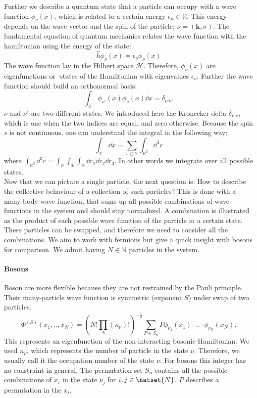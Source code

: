 \documentclass[../main.tex]{subfile}
\begin{document}
Further we describe a quantum state that a particle can occupy with a wave function $\phi_{\nu}(x)$, 
which is related to a certain energy $\epsilon_n \in\mathbb{R}$. This energy depends on 
the wave vector and the spin of the particle: $\nu = (\bm{k}, \sigma)$. The fundamental equation of
quantum mechanics relates the wave function with the hamiltonian using the energy of the state:
\[
    \hat{h} \phi_{\nu}(x) = \epsilon_\nu \phi_{\nu}(x)
\]
The wave function lay in the Hilbert space $\mathcal{H}$. Therefore, $\phi_{\nu}(x)$ are eigenfunctions or -states of
the Hamiltonian with eigenvalues $\epsilon_{\nu}$. Further the wave function should build an orthonormal basis:
\[
    \int_\mathcal{X} \phi_{\nu'}(x) \phi_{\nu}(x) \dd x = \delta_{\nu'\nu}.
\]
$\nu$ and $\nu'$ are two different states. We introduced here the Kronecker delta $\delta_{\nu'\nu}$, which is one when the two indices
are equal, and zero otherwise. Because the spin $s$ is not continuous, one can understand the integral in the following way:
\[
    \int_\mathcal{X} \dd x = \sum_{s\in \mathbb{S}} \int_{\mathbb{R}^3} \dd^3 r
\]  
where $ \int_{\mathbb{R}^3}\dd^3 r = \int_{\mathbb{R}}\int_{\mathbb{R}}\int_{\mathbb{R}} \dd r_1 \dd r_2 \dd r_3$.
In other words we integrate over all possible states.\\

Now that we can picture a single particle, the next question is: How to describe the collective behaviour of a collection of such particles?
This is done with a many-body wave function, that sums up all possible combinations of wave functions in the system and should stay normalized. 
A combination is illustrated as the product of each possible wave function of the particle in a certain state. These particles
can be swapped, and therefore we need to consider all the combinations.
We aim to work with fermions but give a quick insight with bosons for comparison. We admit having $N \in \mathbb{N}$ particles in the system.\\

\paragraph{Bosons}$~$\\

Boson are more flexible because they are not restrained by the Pauli principle.
Their many-particle wave function is symmetric (exponent $S$) under swap of two particles.
\[
    \Phi^{(S)}(x_1,..,x_N) = \left(N!\prod_{N}(n_{\nu})!\right)^{-\frac{1}{2}} \sum_{P\in S_n} P \phi_{\nu_1}(x_1)\cdot ..\cdot \phi_{\nu_N}(x_N).
\]
This represents an eigenfunction of the non-interacting bosonic-Hamiltonian.
We used $n_{\nu}$, which represents the number of particle in the state $\nu$. Therefore, we usually call it the occupation number of the state $\nu$.
For bosons this integer has no constraint in general.
The permutation set $S_n$ contains all the possible combinations of $x_i$ in the state $\nu_j$ for $i,j\in\natset{N}$. $P$ describes a permutation
in the $x_i$.\\
\end{document}
